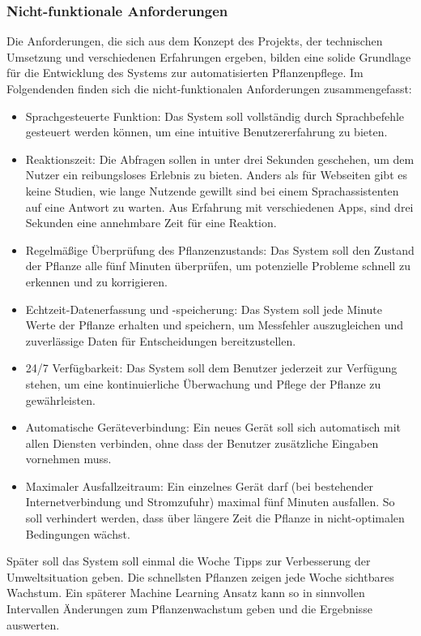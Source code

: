 \subsubsection{Nicht-funktionale Anforderungen}
Die Anforderungen, die sich aus dem Konzept des Projekts, der technischen Umsetzung und verschiedenen Erfahrungen ergeben, bilden eine solide Grundlage für die Entwicklung des Systems zur automatisierten Pflanzenpflege. Im Folgendenden finden sich die nicht-funktionalen Anforderungen zusammengefasst:

\begin{itemize}
    \item Sprachgesteuerte Funktion: Das System soll vollständig durch Sprachbefehle gesteuert werden können, um eine intuitive Benutzererfahrung zu bieten.
    \item Reaktionszeit: Die Abfragen sollen in unter drei Sekunden geschehen, um dem Nutzer ein reibungsloses Erlebnis zu bieten. Anders als für Webseiten gibt es keine Studien, wie lange Nutzende gewillt sind bei einem Sprachassistenten auf eine Antwort zu warten. Aus Erfahrung mit verschiedenen Apps, sind drei Sekunden eine annehmbare Zeit für eine Reaktion.
    \item Regelmäßige Überprüfung des Pflanzenzustands: Das System soll den Zustand der Pflanze alle fünf Minuten überprüfen, um potenzielle Probleme schnell zu erkennen und zu korrigieren.
    \item Echtzeit-Datenerfassung und -speicherung: Das System soll jede Minute Werte der Pflanze erhalten und speichern, um Messfehler auszugleichen und zuverlässige Daten für Entscheidungen bereitzustellen.
    \item 24/7 Verfügbarkeit: Das System soll dem Benutzer jederzeit zur Verfügung stehen, um eine kontinuierliche Überwachung und Pflege der Pflanze zu gewährleisten.
    \item Automatische Geräteverbindung: Ein neues Gerät soll sich automatisch mit allen Diensten verbinden, ohne dass der Benutzer zusätzliche Eingaben vornehmen muss.
    \item Maximaler Ausfallzeitraum: Ein einzelnes Gerät darf (bei bestehender Internetverbindung und Stromzufuhr) maximal fünf Minuten ausfallen. So soll verhindert werden, dass über längere Zeit die Pflanze in nicht-optimalen Bedingungen wächst.
\end{itemize}

Später soll das System soll einmal die Woche Tipps zur Verbesserung der Umweltsituation geben. Die schnellsten Pflanzen zeigen jede Woche sichtbares Wachstum.\cite{sillplantgrowth} Ein späterer Machine Learning Ansatz kann so in sinnvollen Intervallen Änderungen zum Pflanzenwachstum geben und die Ergebnisse auswerten. 

